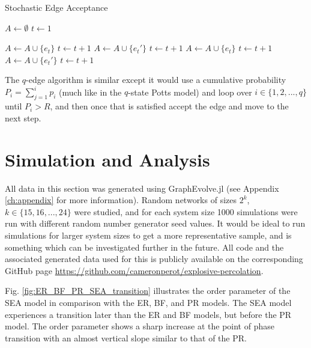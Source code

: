 \begin{algorithm}[H]
	\caption{Stochastic Edge Acceptance}\label{Stochastic-Edge-Acceptance}
	\begin{algorithmic}[1]
		\State $A \gets \emptyset$
		\State $t \gets 1$

				\State $A \gets A \cup \{e_t\}$
				\State $t \gets t+1$
				\State $A \gets A \cup \{e_t'\}$
				\State $t \gets t+1$
				\State $A \gets A \cup \{e_t\}$
				\State $t \gets t+1$
			\Else
				\State $A \gets A \cup \{e_t'\}$
				\State $t \gets t+1$
			\EndIf
		\EndWhile
	\EndProcedure
	\end{algorithmic}
\end{algorithm}

The $q$-edge algorithm is similar except it would use a cumulative probability $P_i = \sum\limits_{j=1}^{i} p_i$ (much like in the $q$-state Potts model) and loop over $i \in \{1, 2, ..., q\}$ until $P_i > R$, and then once that is satisfied accept the edge and move to the next step.



\section{Simulation and Analysis}
All data in this section was generated using GraphEvolve.jl (see Appendix \ref{ch:appendix} for more information).
Random networks of sizes $2^k$, $k \in \{15, 16, ..., 24\}$ were studied, and for each system size 1000 simulations were run with different random number generator seed values.
It would be ideal to run simulations for larger system sizes to get a more representative sample, and is something which can be investigated further in the future.
All code and the associated generated data used for this is publicly available on the corresponding GitHub page \url{https://github.com/cameronperot/explosive-percolation}.

Fig. \ref{fig:ER_BF_PR_SEA_transition} illustrates the order parameter of the SEA model in comparison with the ER, BF, and PR models.
The SEA model experiences a transition later than the ER and BF models, but before the PR model.
The order parameter shows a sharp increase at the point of phase transition with an almost vertical slope similar to that of the PR.


